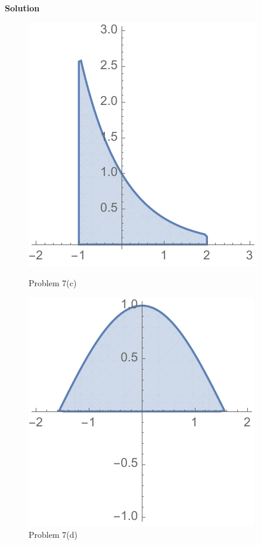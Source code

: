 \documentclass[12pt,oneside]{exam}
\newenvironment{newsolution}{\vspace{.1in}\noindent\textbf{Solution \hspace{.05em}}}{}
\begin{document}
\begin{newsolution}
\begin{figure}[h]
\centering
\begin{minipage}{.5\textwidth}
  \centering
  \includegraphics[width=.4\linewidth]{hw3_plot7c}
  \caption{Problem 7(c)}
\end{minipage}%
\begin{minipage}{.5\textwidth}
  \centering
  \includegraphics[width=.4\linewidth]{hw3_plot7d}
  \caption{Problem 7(d)}
\end{minipage}
\end{figure}

\end{newsolution}
\end{document}
